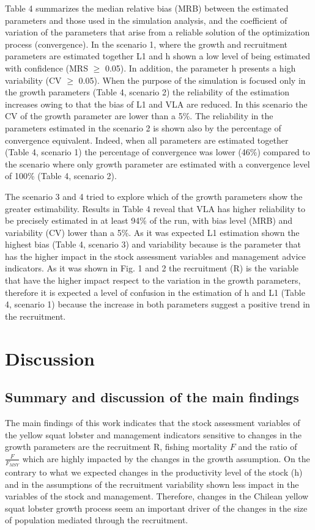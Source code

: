 \documentclass[11pt,letter,]{article}
\begin{document}
Table 4 summarizes the median relative bias (MRB) between the estimated
parameters and those used in the simulation analysis, and the
coefficient of variation of the parameters that arise from a reliable
solution of the optimization process (convergence). In the scenario 1,
where the growth and recruitment parameters are estimated together L1
and h shown a low level of being estimated with confidence (MRS \(\geq\)
0.05). In addition, the parameter h presents a high variability (CV
\(\geq\) 0.05). When the purpose of the simulation is focused only in
the growth parameters (Table 4, scenario 2) the reliability of the
estimation increases owing to that the bias of L1 and VLA are reduced.
In this scenario the CV of the growth parameter are lower than a 5\%.
The reliability in the parameters estimated in the scenario 2 is shown
also by the percentage of convergence equivalent. Indeed, when all
parameters are estimated together (Table 4, scenario 1) the percentage
of convergence was lower (46\%) compared to the scenario where only
growth parameter are estimated with a convergence level of 100\% (Table
4, scenario 2).

The scenario 3 and 4 tried to explore which of the growth parameters
show the greater estimability. Results in Table 4 reveal that VLA has
higher reliability to be precisely estimated in at least 94\% of the
run, with bias level (MRB) and variability (CV) lower than a 5\%. As it
was expected L1 estimation shown the highest bias (Table 4, scenario 3)
and variability because is the parameter that has the higher impact in
the stock assessment variables and management advice indicators. As it
was shown in Fig. 1 and 2 the recruitment (R) is the variable that have
the higher impact respect to the variation in the growth parameters,
therefore it is expected a level of confusion in the estimation of h and
L1 (Table 4, scenario 1) because the increase in both parameters suggest
a positive trend in the recruitment.

\section{Discussion}\label{discussion}

\subsection{Summary and discussion of the main
findings}\label{summary-and-discussion-of-the-main-findings}

The main findings of this work indicates that the stock assessment
variables of the yellow squat lobster and management indicators
sensitive to changes in the growth parameters are the recruitment R,
fishing mortality \(F\) and the ratio of \(\frac{F}{F_{MSY}}\) which are
highly impacted by the changes in the growth assumption. On the contrary
to what we expected changes in the productivity level of the stock (h)
and in the assumptions of the recruitment variability shown less impact
in the variables of the stock and management. Therefore, changes in the
Chilean yellow squat lobster growth process seem an important driver of
the changes in the size of population mediated through the recruitment.
\end{document}

